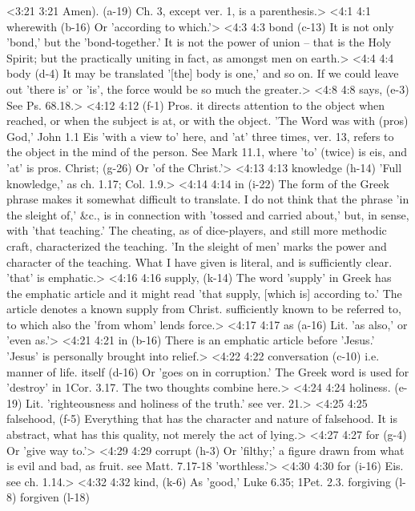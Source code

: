 <3:21 3:21  Amen). (a-19)  Ch. 3, except ver. 1, is a parenthesis.>
<4:1 4:1  wherewith (b-16)  Or 'according to which.'>
<4:3 4:3  bond (c-13)  It is not only 'bond,' but the 'bond-together.' It is not the  power of union -- that is the Holy Spirit; but the practically  uniting in fact, as amongst men on earth.>
<4:4 4:4  body (d-4)  It may be translated '[the] body is one,' and so on. If we  could leave out 'there is' or 'is', the force would be so much  the greater.>
<4:8 4:8  says, (e-3)  See Ps. 68.18.>
<4:12 4:12   (f-1)  Pros. it directs attention to the object when reached, or  when the subject is at, or with the object. 'The Word was with  (pros) God,' John 1.1 Eis 'with a view to' here, and 'at'  three times, ver. 13, refers to the object in the mind of the  person. See Mark 11.1, where 'to' (twice) is eis, and 'at' is  pros.
  Christ; (g-26)  Or 'of the Christ.'>
<4:13 4:13  knowledge (h-14)  'Full knowledge,' as ch. 1.17; Col. 1.9.>
<4:14 4:14  in (i-22)  The form of the Greek phrase makes it somewhat difficult to  translate. I do not think that the phrase 'in the sleight of,'  &c., is in connection with 'tossed and carried about,' but, in  sense, with 'that teaching.' The cheating, as of dice-players,  and still more methodic craft, characterized the teaching. 'In  the sleight of men' marks the power and character of the  teaching. What I have given is literal, and is sufficiently  clear. 'that' is emphatic.>
<4:16 4:16  supply, (k-14)  The word 'supply' in Greek has the emphatic article and it  might read 'that supply, [which is] according to.' The article  denotes a known supply from Christ. sufficiently known to be  referred to, to which also the 'from whom' lends force.>
<4:17 4:17  as (a-16)  Lit. 'as also,' or 'even as.'>
<4:21 4:21  in (b-16)  There is an emphatic article before 'Jesus.' 'Jesus' is  personally brought into relief.>
<4:22 4:22  conversation (c-10)  i.e. manner of life.
  itself (d-16)  Or 'goes on in corruption.' The Greek word is used for  'destroy' in 1Cor. 3.17. The two thoughts combine here.>
<4:24 4:24  holiness. (e-19)  Lit. 'righteousness and holiness of the truth.' see ver. 21.>
<4:25 4:25  falsehood, (f-5)  Everything that has the character and nature of falsehood. It  is abstract, what has this quality, not merely the act of  lying.>
<4:27 4:27  for (g-4)  Or 'give way to.'>
<4:29 4:29  corrupt (h-3)  Or 'filthy;' a figure drawn from what is evil and bad, as  fruit. see Matt. 7.17-18 'worthless.'>
<4:30 4:30  for (i-16)  Eis. see ch. 1.14.>
<4:32 4:32  kind, (k-6)  As 'good,' Luke 6.35; 1Pet. 2.3.
  forgiving (l-8)  forgiven (l-18)
